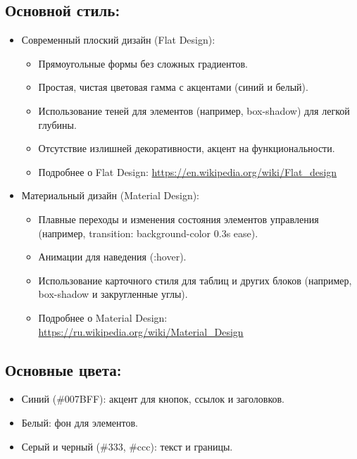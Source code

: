 \documentclass[a4paper,12pt]{article}
\begin{document}
\subsection{Основной стиль:}

\begin{itemize}
    \item Современный плоский дизайн (Flat Design):
          \begin{itemize}
              \item Прямоугольные формы без сложных градиентов.
              \item Простая, чистая цветовая гамма с акцентами (синий и белый).
              \item Использование теней для элементов (например, box-shadow) для легкой глубины.
              \item Отсутствие излишней декоративности, акцент на функциональности.
              \item Подробнее о Flat Design: \url{https://en.wikipedia.org/wiki/Flat_design}
          \end{itemize}

    \item Материальный дизайн (Material Design):
          \begin{itemize}
              \item Плавные переходы и изменения состояния элементов управления (например, transition: background-color 0.3s ease).
              \item Анимации для наведения (:hover).
              \item Использование карточного стиля для таблиц и других блоков (например, box-shadow и закругленные углы).
              \item Подробнее о Material Design:  \url{https://ru.wikipedia.org/wiki/Material_Design}
          \end{itemize}
\end{itemize}

\subsection{Основные цвета:}

\begin{itemize}
    \item Синий (\#007BFF): акцент для кнопок, ссылок и заголовков.
    \item Белый: фон для элементов.
    \item Серый и черный (\#333, \#ccc): текст и границы.
\end{itemize}
\end{document}
